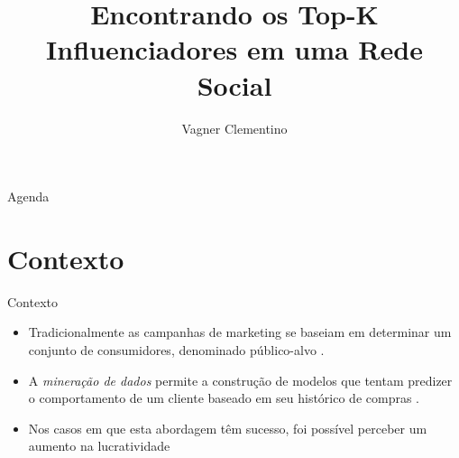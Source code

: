 \documentclass[t,14pt,mathserif,xcolor=table]{beamer}
\title[] %
{Encontrando os Top-K Influenciadores em uma Rede Social}
\subtitle{Vagner Clementino}
\institute[] %
{
  Departamento de Ciência da Computação\\
  Universidade Federal de Minas Gerais(UFMG)\\
  Projeto e Análise de Algoritmos - 2015-1\\
  }
\date[2015/06/21] %
\begin{document}
\begin{frame}
  \titlepage
\end{frame}

\begin{frame}{Agenda}
  \tableofcontents
\end{frame}






\section{Contexto}

\begin{frame}{Contexto}
	\begin{itemize}
	
		\item Tradicionalmente as campanhas de marketing se baseiam em determinar um conjunto de consumidores, denominado público-alvo \cite{hughes1996complete}{}.
		
		\item A \textit{mineração de dados} permite a construção de modelos que tentam predizer o comportamento de um cliente baseado em seu histórico de compras \cite{kumar1999extracting}{}.
		
		\item  Nos casos em que esta abordagem têm sucesso, foi possível perceber um aumento na lucratividade \cite{piatetsky1999estimating}
		
		
		\end{itemize}
	
\end{frame}

\end{document}
